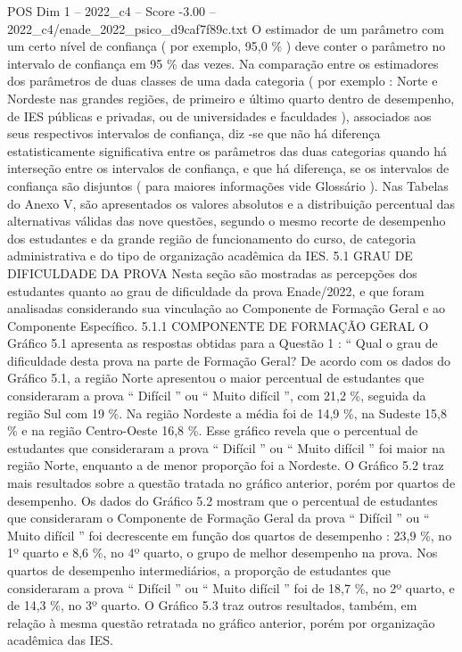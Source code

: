 \begin{textsample}{POS Dim 1 – 2022\_c4 – Score -3.00 – 2022\_c4/enade\_2022\_psico\_d9caf7f89c.txt}
O estimador de um parâmetro com um certo nível de confiança ( por exemplo, 95,0 \% ) deve conter o parâmetro no intervalo de confiança em 95 \% das vezes.
Na comparação entre os estimadores dos parâmetros de duas classes de uma dada categoria ( por exemplo : Norte e Nordeste nas grandes regiões, de primeiro e último quarto dentro de desempenho, de IES públicas e privadas, ou de universidades e faculdades ), associados aos seus respectivos intervalos de confiança, diz -se que não há diferença estatisticamente significativa entre os parâmetros das duas categorias quando há interseção entre os intervalos de confiança, e que há diferença, se os intervalos de confiança são disjuntos ( para maiores informações vide Glossário ).
Nas Tabelas do Anexo V, são apresentados os valores absolutos e a distribuição percentual das alternativas válidas das nove questões, segundo o mesmo recorte de desempenho dos estudantes e da grande região de funcionamento do curso, de categoria administrativa e do tipo de organização acadêmica da IES. 5.1 GRAU DE DIFICULDADE DA PROVA Nesta seção são mostradas as percepções dos estudantes quanto ao grau de dificuldade da prova Enade/2022, e que foram analisadas considerando sua vinculação ao Componente de Formação Geral e ao Componente Específico. 5.1.1 COMPONENTE DE FORMAÇÃO GERAL O Gráfico 5.1 apresenta as respostas obtidas para a Questão 1 : “ Qual o grau de dificuldade desta prova na parte de Formação Geral?
De acordo com os dados do Gráfico 5.1, a região Norte apresentou o maior percentual de estudantes que consideraram a prova “ Difícil ” ou “ Muito difícil ”, com 21,2 \%, seguida da região Sul com 19 \%.
Na região Nordeste a média foi de 14,9 \%, na Sudeste 15,8 \% e na região Centro-Oeste 16,8 \%.
Esse gráfico revela que o percentual de estudantes que consideraram a prova “ Difícil ” ou “ Muito difícil ” foi maior na região Norte, enquanto a de menor proporção foi a Nordeste.
O Gráfico 5.2 traz mais resultados sobre a questão tratada no gráfico anterior, porém por quartos de desempenho.
Os dados do Gráfico 5.2 mostram que o percentual de estudantes que consideraram o Componente de Formação Geral da prova “ Difícil ” ou “ Muito difícil ” foi decrescente em função dos quartos de desempenho : 23,9 \%, no 1º quarto e 8,6 \%, no 4º quarto, o grupo de melhor desempenho na prova.
Nos quartos de desempenho intermediários, a proporção de estudantes que consideraram a prova “ Difícil ” ou “ Muito difícil ” foi de 18,7 \%, no 2º quarto, e de 14,3 \%, no 3º quarto.
O Gráfico 5.3 traz outros resultados, também, em relação à mesma questão retratada no gráfico anterior, porém por organização acadêmica das IES.

\end{textsample}

